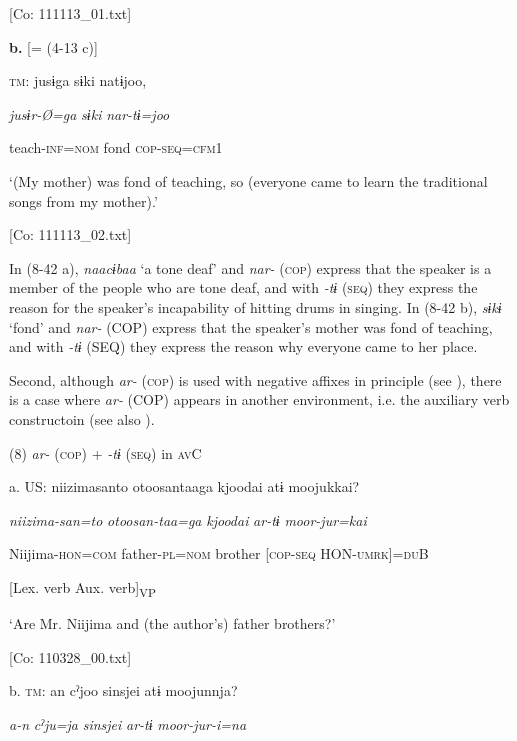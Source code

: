       [Co: 111113\_01.txt]

  \textbf{b.}  [= (4-13 c)]

    \textsc{tm}:  jusɨga  sɨki  natɨjoo,

      \textit{jusɨr-Ø=ga}  \textit{sɨki}  \textit{nar-tɨ=joo}

      teach-\textsc{inf}=\textsc{nom}  fond  \textsc{cop}-\textsc{seq}=\textsc{cfm}1

      ‘(My mother) was fond of teaching, so (everyone came to learn the traditional songs from my mother).’

      [Co: 111113\_02.txt]

In (8-42 a), \textit{naacɨbaa} ‘a tone deaf’ and \textit{nar-} (\textsc{cop}) express that the speaker is a member of the people who are tone deaf, and with \textit{{}-tɨ} (\textsc{seq}) they express the reason for the speaker’s incapability of hitting drums in singing. In (8-42 b), \textit{sɨkɨ} ‘fond’ and \textit{nar-} (COP) express that the speaker’s mother was fond of teaching, and with \textit{{}-tɨ} (SEQ) they express the reason why everyone came to her place.

  Second, although \textit{ar-} (\textsc{cop}) is used with negative affixes in principle (see ), there is a case where \textit{ar-} (COP) appears in another environment, i.e. the auxiliary verb constructoin (see also ).

(8)  \textit{ar-} (\textsc{cop}) + \textit{{}-tɨ} (\textsc{seq}) in \textsc{av}C

  a.  US:  {\textbar}niizimasanto  otoosan{\textbar}taaga  {\textbar}kjoodai{\textbar}  atɨ  moojukkai?

      \textit{niizima-san=to}  \textit{otoosan-taa=ga}  \textit{kjoodai}  \textit{ar-tɨ}  \textit{moor-jur=kai}

      Niijima{}-\textsc{hon}=\textsc{com}  father{}-\textsc{pl}=\textsc{nom}  brother  [\textsc{cop}-\textsc{seq}  HON-\textsc{umrk}]=\textsc{du}B

            [Lex. verb  Aux. verb]\textsubscript{VP}

      ‘Are Mr. Niijima and (the author’s) father brothers?’

      [Co: 110328\_00.txt]

  b.  \textsc{tm}:  an  cˀjoo  sinsjei  atɨ  moojunnja?

      \textit{a-n}  \textit{cˀju=ja}  \textit{sinsjei}  \textit{ar-tɨ}  \textit{moor-jur-i=na}

